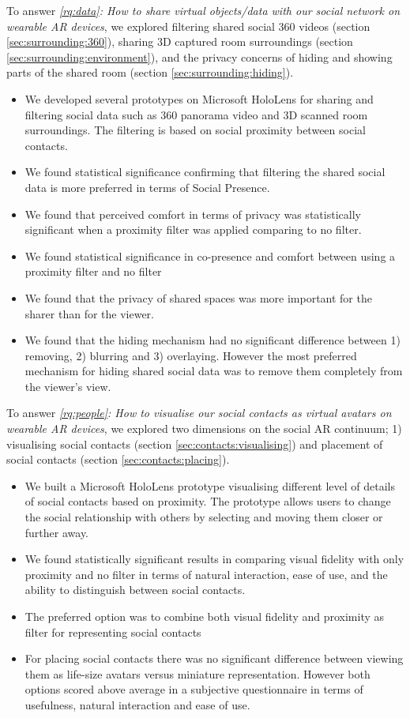 To answer \textit{\ref{rq:data}: How to share virtual objects/data with our social network on wearable AR devices}, we explored filtering shared social 360 videos (section \ref{sec:surrounding:360}), sharing 3D captured room surroundings (section \ref{sec:surrounding:environment}), and the privacy concerns of hiding and showing parts of the shared room (section \ref{sec:surrounding:hiding}). 

\begin{itemize}
    \item{We developed several prototypes on Microsoft HoloLens for sharing and filtering social data such as 360 panorama video and 3D scanned room surroundings. The filtering is based on social proximity between social contacts.}
    \item{We found statistical significance confirming that filtering the shared social data is more preferred in terms of Social Presence.}
    \item{We found that perceived comfort in terms of privacy was statistically significant when a proximity filter was applied comparing to no filter.}
    \item{We found statistical significance in co-presence and comfort between using a proximity filter and no filter}
    \item{We found that the privacy of shared spaces was more important for the sharer than for the viewer.}
    \item{We found that the hiding mechanism had no significant difference between 1) removing, 2) blurring and 3) overlaying. However the most preferred mechanism for hiding shared social data was to remove them completely from the viewer's view.}
\end{itemize}

To answer \textit{\ref{rq:people}: How to visualise our social contacts as virtual avatars on wearable AR devices}, we explored two dimensions on the social AR continuum; 1) visualising social contacts (section \ref{sec:contacts:visualising}) and placement of social contacts (section \ref{sec:contacts:placing}). 

\begin{itemize}
    \item{We built a Microsoft HoloLens prototype visualising different level of details of social contacts based on proximity. The prototype allows users to change the social relationship with others by selecting and moving them closer or further away.}
    \item{We found statistically significant results in comparing visual fidelity with only proximity and no filter in terms of natural interaction, ease of use, and the ability to distinguish between social contacts.}
    \item{The preferred option was to combine both visual fidelity and proximity as filter for representing social contacts}
    \item{For placing social contacts there was no significant difference between viewing them as life-size avatars versus miniature representation. However both options scored above average in a subjective questionnaire in terms of usefulness, natural interaction and ease of use.}
\end{itemize}

